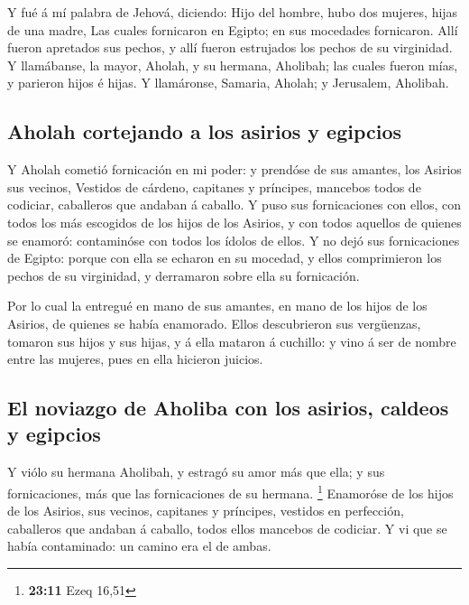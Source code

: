  Y fué á mí palabra de Jehová, diciendo:  Hijo
del hombre, hubo dos mujeres, hijas de una madre,  Las
cuales fornicaron en Egipto; en sus mocedades fornicaron. Allí fueron
apretados sus pechos, y allí fueron estrujados los pechos de su
virginidad.  Y llamábanse, la mayor, Aholah, y su hermana,
Aholibah; las cuales fueron mías, y parieron hijos é hijas. Y
llamáronse, Samaria, Aholah; y Jerusalem, Aholibah.

\hypertarget{aholah-cortejando-a-los-asirios-y-egipcios}{%
\subsection{Aholah cortejando a los asirios y
egipcios}\label{aholah-cortejando-a-los-asirios-y-egipcios}}

 Y Aholah cometió fornicación en mi poder: y prendóse de sus
amantes, los Asirios sus vecinos,  Vestidos de cárdeno,
capitanes y príncipes, mancebos todos de codiciar, caballeros que
andaban á caballo.  Y puso sus fornicaciones con ellos, con
todos los más escogidos de los hijos de los Asirios, y con todos
aquellos de quienes se enamoró: contaminóse con todos los ídolos de
ellos.  Y no dejó sus fornicaciones de Egipto: porque con
ella se echaron en su mocedad, y ellos comprimieron los pechos de su
virginidad, y derramaron sobre ella su fornicación.

 Por lo cual la entregué en mano de sus amantes, en mano de
los hijos de los Asirios, de quienes se había enamorado. 
Ellos descubrieron sus vergüenzas, tomaron sus hijos y sus hijas, y á
ella mataron á cuchillo: y vino á ser de nombre entre las mujeres, pues
en ella hicieron juicios.

\hypertarget{el-noviazgo-de-aholiba-con-los-asirios-caldeos-y-egipcios}{%
\subsection{El noviazgo de Aholiba con los asirios, caldeos y
egipcios}\label{el-noviazgo-de-aholiba-con-los-asirios-caldeos-y-egipcios}}

 Y viólo su hermana Aholibah, y estragó su amor más que
ella; y sus fornicaciones, más que las fornicaciones de su hermana.
\footnote{\textbf{23:11} Ezeq 16,51}  Enamoróse de los
hijos de los Asirios, sus vecinos, capitanes y príncipes, vestidos en
perfección, caballeros que andaban á caballo, todos ellos mancebos de
codiciar.  Y vi que se había contaminado: un camino era el
de ambas.

